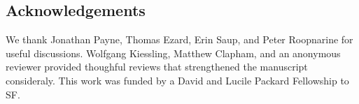 \documentclass[12pt,letterpaper]{article}
\begin{document}
\begin{refsection}
\section{Acknowledgements}

We thank Jonathan Payne, Thomas Ezard, Erin Saup, and Peter Roopnarine for useful discussions. Wolfgang Kiessling, Matthew Clapham, and an anonymous reviewer provided thoughful reviews that strengthened the manuscript consideraly. This work was funded by a David and Lucile Packard Fellowship to SF.


\printbibliography
\end{refsection}
\end{document}
